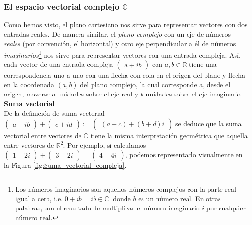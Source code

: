 \documentclass[notasLineal]{subfiles}
\begin{document}
\subsubsection*{El espacio vectorial complejo \texorpdfstring{$\mathbb{C}$}{TEXT}}

Como hemos visto, el plano cartesiano nos sirve para representar vectores con dos entradas reales. De manera similar, el \emph{plano complejo} \textemdash con un eje de números \emph{reales} (por convención, el horizontal) y otro eje perpendicular a él de números \emph{imaginarios}\footnote{Los números imaginarios son aquellos números complejos con la parte real igual a cero, i.e. $0+ib=ib\in\mathbb{C}$, donde $b$ es un número real. En otras palabras, son el resultado de multiplicar el número imaginario $i$ por cualquier número real.}\textemdash\hspace{0.5mm} nos sirve para representar vectores con una entrada compleja. Así, cada vector de una entrada compleja $\begin{pmatrix}a+ib\end{pmatrix}$ con $a,b\in\mathbb{R}$ tiene una correspondencia uno a uno con una flecha con cola en el origen del plano y flecha en la coordenada $(a,b)$ del plano complejo, la cual corresponde a, desde el origen, moverse $a$ unidades sobre el eje real y $b$ unidades sobre el eje imaginario. \\

\textbf{Suma vectorial} \\

De la definición de suma vectorial $\begin{pmatrix}a+ib\end{pmatrix}+\begin{pmatrix}c+id\end{pmatrix}:=\begin{pmatrix}(a+c)+(b+d)i\end{pmatrix}$ se deduce que la suma vectorial entre vectores de $\mathbb{C}$ tiene la misma interpretación geométrica que aquella entre vectores de $\mathbb{R}^2$. Por ejemplo, si calculamos $\begin{pmatrix}1+2i\end{pmatrix}+\begin{pmatrix}3+2i\end{pmatrix}=\begin{pmatrix}4+4i\end{pmatrix}$, podemos representarlo visualmente en la Figura \ref{fig:Suma_vectorial_compleja}. \\
\end{document}
